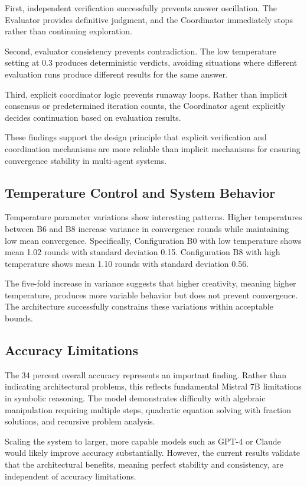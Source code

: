 \documentclass[conference]{IEEEtran}
\begin{document}
First, independent verification successfully prevents answer oscillation. The Evaluator provides definitive judgment, and the Coordinator immediately stops rather than continuing exploration.

Second, evaluator consistency prevents contradiction. The low temperature setting at 0.3 produces deterministic verdicts, avoiding situations where different evaluation runs produce different results for the same answer.

Third, explicit coordinator logic prevents runaway loops. Rather than implicit consensus or predetermined iteration counts, the Coordinator agent explicitly decides continuation based on evaluation results.

These findings support the design principle that explicit verification and coordination mechanisms are more reliable than implicit mechanisms for ensuring convergence stability in multi-agent systems.

\subsection{Temperature Control and System Behavior}

Temperature parameter variations show interesting patterns. Higher temperatures between B6 and B8 increase variance in convergence rounds while maintaining low mean convergence. Specifically, Configuration B0 with low temperature shows mean 1.02 rounds with standard deviation 0.15. Configuration B8 with high temperature shows mean 1.10 rounds with standard deviation 0.56.

The five-fold increase in variance suggests that higher creativity, meaning higher temperature, produces more variable behavior but does not prevent convergence. The architecture successfully constrains these variations within acceptable bounds.

\subsection{Accuracy Limitations}

The 34 percent overall accuracy represents an important finding. Rather than indicating architectural problems, this reflects fundamental Mistral 7B limitations in symbolic reasoning. The model demonstrates difficulty with algebraic manipulation requiring multiple steps, quadratic equation solving with fraction solutions, and recursive problem analysis.

Scaling the system to larger, more capable models such as GPT-4 or Claude would likely improve accuracy substantially. However, the current results validate that the architectural benefits, meaning perfect stability and consistency, are independent of accuracy limitations.
\end{document}

